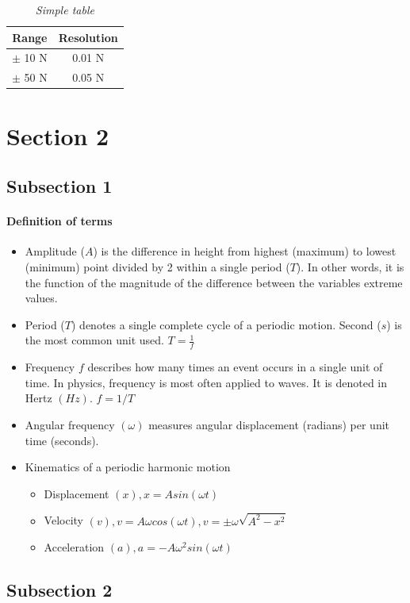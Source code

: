 \documentclass[12pt,a4paper]{article}
\begin{document}
\begin{table}[H]
\centering
\begin{tabular}{|c|c|}
\hline
\textbf{Range} & \textbf{Resolution} \\ 
\hline
$\pm$ 10 N	& 0.01 N \\
\hline
$\pm$ 50 N	& 0.05 N \\
\hline
\end{tabular} 
\caption{\textit{Simple table}}
\label{table:Force sensor resolution}
\end{table}

\section{Section 2}
\subsection{Subsection 1}
\paragraph{Definition of terms}
\begin{itemize}
\item Amplitude ($A$) is the difference in height from highest (maximum) to lowest (minimum) point divided by 2 within a single period ($T$). In other words, it is the function of the magnitude of the difference between the variables extreme values.
\item Period ($T$) denotes a single complete cycle of a periodic motion. Second ($s$) is the most common unit used.  $T = \frac{1}{f}$
\item Frequency $f$ describes how many times an event occurs in a single unit of time. In physics, frequency is most often applied to waves. It is denoted in Hertz $(Hz)$.  $f = 1/T$
\item Angular frequency $(\omega)$ measures angular displacement (radians) per unit time (seconds).
\item Kinematics of a periodic harmonic motion
	\begin{itemize}
	\item Displacement $(x), x = A sin(\omega t)$
	\item Velocity $(v), v = A\omega cos(\omega t), v = \pm \omega \sqrt{A^2-x^2}$
	\item Acceleration $(a), a = -A\omega^2 sin(\omega t)$
	\end{itemize}
\end{itemize}

\subsection{Subsection 2}
\blindtext
\end{document}
